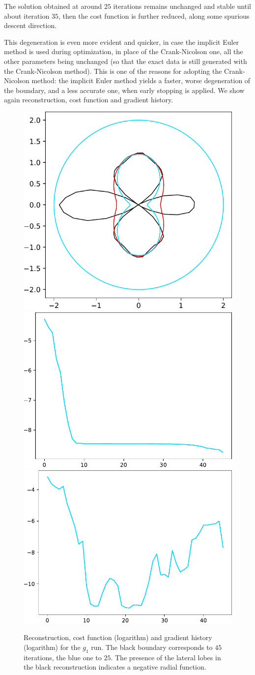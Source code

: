 \documentclass[english,a4paper,9pt,oneside]{scrbook}	%
\theoremstyle{break}
\theoremstyle{remark}
\begin{document}
The solution obtained at around $25$ iterations remains unchanged and stable until about iteration $35$, then the cost function is further reduced, along some spurious descent direction.

This degeneration is even more evident and quicker, in case the implicit Euler method is used during optimization, in place of the Crank-Nicolson one, all the other parameters being unchanged (so that the exact data is still generated with the Crank-Nicolson method). This is one of the reasons for adopting the Crank-Nicolson method: the implicit Euler method yields a faster, worse degeneration of the boundary, and a less accurate one, when early stopping is applied. We show again reconstruction, cost function and gradient history.

\begin{figure}[H]
\centering
\includegraphics[height=0.25\columnwidth]{Images/comparison_25_45_euler.pdf}
\includegraphics[height=0.25\columnwidth]{Images/hourglass_constant_euler/cost_function_45.pdf}
\includegraphics[height=0.25\columnwidth]{Images/hourglass_constant_euler/gradient_infty_norm_45.pdf}
\caption{Reconstruction, cost function (logarithm) and gradient history (logarithm) for the $g_1$ run. The black boundary corresponds to $45$ iterations, the blue one to $25$. The presence of the lateral lobes in the black reconstruction indicates a negative radial function.}\label{fig:degenerate_euler}
\end{figure}
\end{document}
